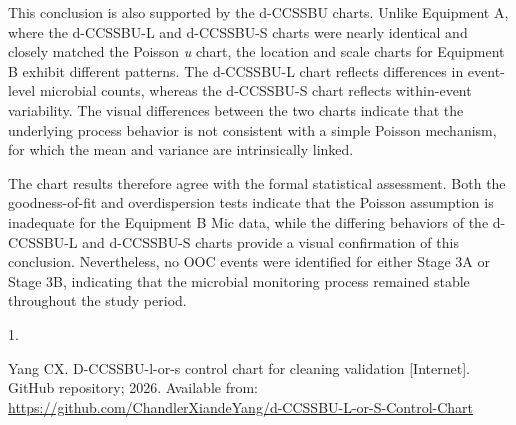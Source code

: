 \documentclass[
  12pt,
  letterpaper,
  DIV=11,
  numbers=noendperiod]{scrartcl}
\newlength{\cslhangindent}
\newlength{\csllabelwidth}
\newenvironment{CSLReferences}[2] %
 {\begin{list}{}{%
  \setlength{\itemindent}{0pt}
  \setlength{\leftmargin}{0pt}
  \setlength{\parsep}{0pt}
  \ifodd #1
   \setlength{\leftmargin}{\cslhangindent}
   \setlength{\itemindent}{-1\cslhangindent}
  \fi
  \setlength{\itemsep}{#2\baselineskip}}}
 {\end{list}}
\newcommand{\CSLLeftMargin}[1]{\parbox[t]{\csllabelwidth}{\strut#1\strut}}
\newcommand{\CSLRightInline}[1]{\parbox[t]{\linewidth - \csllabelwidth}{\strut#1\strut}}
\begin{document}
This conclusion is also supported by the d-CCSSBU charts. Unlike
Equipment A, where the d-CCSSBU-L and d-CCSSBU-S charts were nearly
identical and closely matched the Poisson \emph{u} chart, the location
and scale charts for Equipment B exhibit different patterns. The
d-CCSSBU-L chart reflects differences in event-level microbial counts,
whereas the d-CCSSBU-S chart reflects within-event variability. The
visual differences between the two charts indicate that the underlying
process behavior is not consistent with a simple Poisson mechanism, for
which the mean and variance are intrinsically linked.

The chart results therefore agree with the formal statistical
assessment. Both the goodness-of-fit and overdispersion tests indicate
that the Poisson assumption is inadequate for the Equipment B Mic data,
while the differing behaviors of the d-CCSSBU-L and d-CCSSBU-S charts
provide a visual confirmation of this conclusion. Nevertheless, no OOC
events were identified for either Stage 3A or Stage 3B, indicating that
the microbial monitoring process remained stable throughout the study
period.

\begin{table}[!h]
\centering
\caption{\label{tab:display-poisson-u-decision-summary-equipment-b-v3}Mic data Poisson assessment and chart selection for Equipment B.}
\centering
{}
\end{table}

\protect{}\label{refs}
\begin{CSLReferences}{0}{1}
\CSLLeftMargin{1. }%
\CSLRightInline{Yang CX. D-CCSSBU-l-or-s control chart for cleaning
validation {[}Internet{]}. GitHub repository; 2026. Available from:
\url{https://github.com/ChandlerXiandeYang/d-CCSSBU-L-or-S-Control-Chart}}

\end{CSLReferences}
\end{document}
